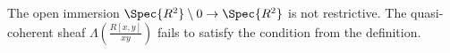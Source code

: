 \begin{nonexample}
The open immersion $\Spec{R^2}\setminus 0 \rightarrow \Spec{R^2}$ is not restrictive.
The quasi-coherent sheaf $\Lambda(\frac{R[x,y]}{xy})$  fails to satisfy the condition from the definition.
\end{nonexample}
